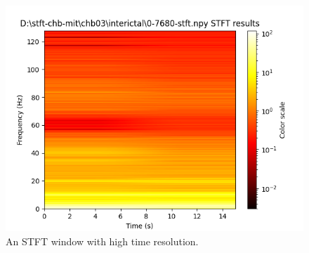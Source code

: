 \documentclass[12pt]{article}
\begin{document}
\begin{figure}[H]
\includegraphics[width=\textwidth]{stft2}
\centering
\caption{An STFT window with high time resolution.}
\label{fig:stft2}
\end{figure}
\end{document}
